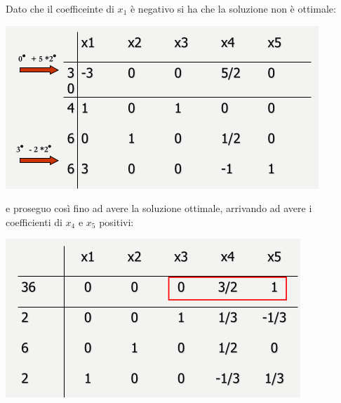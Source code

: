 \message{ !name(ro.tex)}\documentclass[a4paper,12pt, oneside]{book}
\begin{document}
Dato che il coefficeinte di $x_1$ è negativo si ha che la soluzione
non è ottimale:
\begin{center}
  \includegraphics[scale = 0.8]{img/tab4.png}
\end{center}
e proseguo così fino ad avere la soluzione ottimale, arrivando ad
avere i coefficienti di $x_4$ e $x_5$ positivi:
\begin{center}
  \includegraphics[scale = 0.8]{img/tab5.png}
\end{center}
\end{document}
